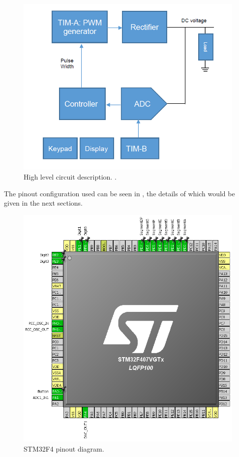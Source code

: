 \documentclass[a4paper,titlepage]{article}
\begin{document}
\begin{figure}[!htb]
  \centering
  \includegraphics[width=\columnwidth]{figures/high_level_circuit_lab3.png}
  \caption{High level circuit description. \cite{lab3_handout}.}
  \label{fig:circuit_lab3}
\end{figure}

The pinout configuration used can be seen in , the details of which would be given in the next sections.

\begin{figure}[!htb]
  \centering
  \includegraphics[width=\columnwidth]{figures/pinout.png}
  \caption
  {STM32F4 pinout diagram.}
  \label{fig:pinout}
\end{figure}
\end{document}
